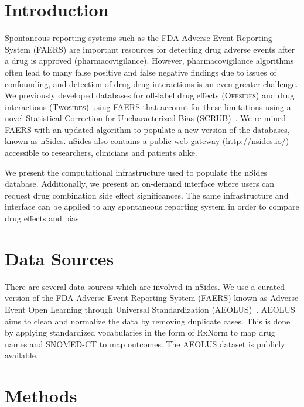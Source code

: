 \documentclass{ws-procs11x85}
\begin{document}
\bodymatter

\section{Introduction}

Spontaneous reporting systems such as the FDA Adverse Event Reporting
System (FAERS) are important resources for detecting drug adverse
events after a drug is approved (pharmacovigilance). However,
pharmacovigilance algorithms often lead to many false positive and
false negative findings due to issues of confounding, and detection of
drug-drug interactions is an even greater challenge.  We previously
developed databases for off-label drug effects (O\textsc{ffsides}) and
drug interactions (T\textsc{wosides}) using FAERS that account for
these limitations using a novel Statistical Correction for
Uncharacterized Bias (SCRUB)~\cite{Tatonetti2012}.  We re-mined FAERS
with an updated algorithm to populate a new version of the databases,
known as nSides.  nSides also contains a public web gateway
(http://nsides.io/) accessible to researchers, clinicians and patients
alike.

We present the computational infrastructure used to populate the
nSides database.  Additionally, we present an on-demand interface
where users can request drug combination side effect
significances. The same infrastructure and interface can be applied to
any spontaneous reporting system in order to compare drug effects and
bias.


\section{Data Sources}

There are several data sources which are involved in nSides. We use a
curated version of the FDA Adverse Event Reporting System (FAERS)
known as Adverse Event Open Learning through Universal Standardization
(AEOLUS)~\cite{AEOLUS}.  AEOLUS aims to clean and normalize the data
by removing duplicate cases. This is done by applying standardized
vocabularies in the form of RxNorm to map drug names and SNOMED-CT to
map outcomes. The AEOLUS dataset is publicly available.

\section{Methods}
\end{document}
